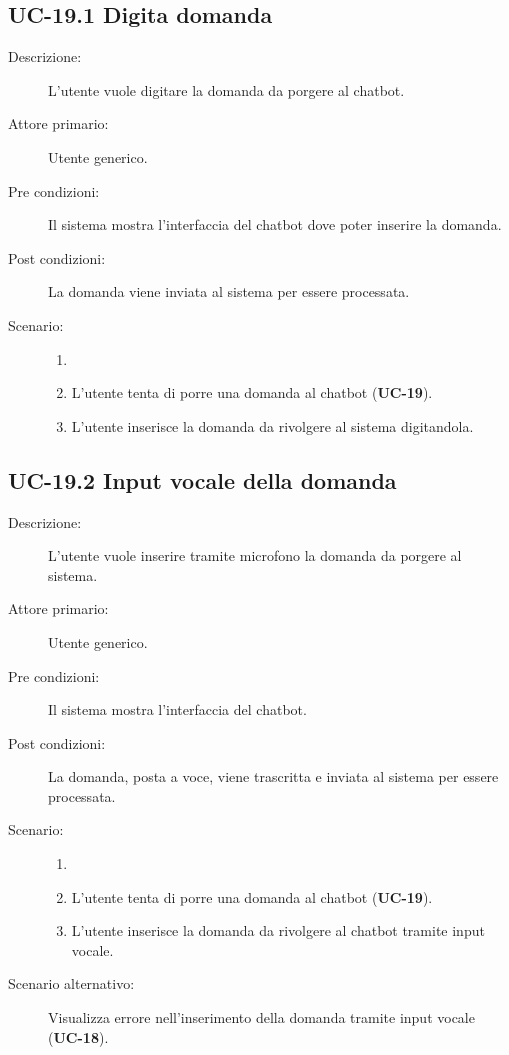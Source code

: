 \subsection{UC-19.1 Digita domanda}
\begin{description}
    \item[Descrizione:] L'utente vuole digitare la domanda da porgere al chatbot.
    \item[Attore primario:] Utente generico.
    \item[Pre condizioni:] Il sistema mostra l'interfaccia del chatbot dove poter inserire la domanda.
    \item[Post condizioni:] La domanda viene inviata al sistema per essere processata.
    \item[Scenario:]
    \begin{enumerate}
        \item[]
        \item L’utente tenta di porre una domanda al chatbot (\textbf{UC-19}).
        \item L'utente inserisce la domanda da rivolgere al sistema digitandola.
    \end{enumerate}
\end{description}

\subsection{UC-19.2 Input vocale della domanda}
\begin{description}
    \item[Descrizione:] L'utente vuole inserire tramite microfono la domanda da porgere al sistema.
    \item[Attore primario:] Utente generico.
    \item[Pre condizioni:] Il sistema mostra l'interfaccia del chatbot.
    \item[Post condizioni:] La domanda, posta a voce, viene trascritta e inviata al sistema per essere processata.
    \item[Scenario:]
    \begin{enumerate}
        \item[]
        \item L’utente tenta di porre una domanda al chatbot (\textbf{UC-19}).
        \item L'utente inserisce la domanda da rivolgere al chatbot tramite input vocale.
    \end{enumerate}
    \item[Scenario alternativo:] Visualizza errore nell'inserimento della domanda tramite input vocale (\textbf{UC-18}).
\end{description}

